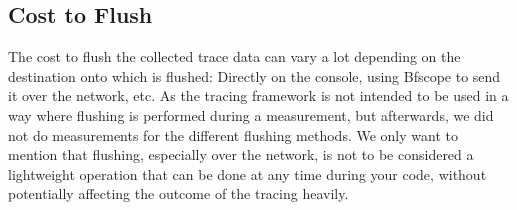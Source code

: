 \documentclass[a4paper,11pt,twoside]{report}
\begin{document}
\subsection{Cost to Flush}

The cost to flush the collected trace data can vary a lot depending on the
destination onto which is flushed: Directly on the console, using Bfscope to
send it over the network, etc. As the tracing framework is not intended to be
used in a way where flushing is performed during a measurement, but afterwards,
we did not do measurements for the different flushing methods. We only want to
mention that flushing, especially over the network, is not to be considered a
lightweight operation that can be done at any time during your code, without
potentially affecting the outcome of the tracing heavily.

\end{document}
